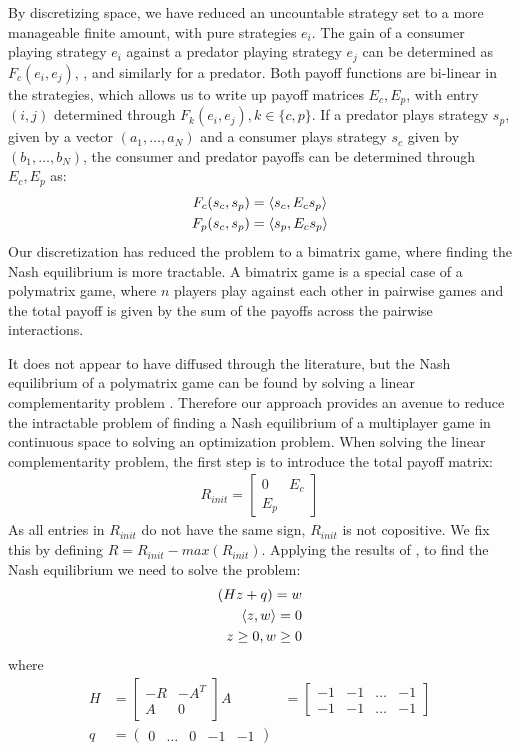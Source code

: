 By discretizing space, we have reduced an uncountable strategy set to a more manageable finite amount, with pure strategies $e_i$. The gain of a consumer playing strategy $e_i$ against a predator playing strategy $e_j$ can be determined as $F_c(e_i,e_j)$, , and similarly for a predator. Both payoff functions are bi-linear in the strategies, which allows us to write up payoff matrices $E_c, E_p$, with entry $(i,j)$ determined through $F_k(e_i,e_j), k \in \{c, p\}$. If a predator plays strategy $s_p$, given by a vector $(a_1,\dots,a_N)$ and a consumer plays strategy $s_c$ given by $(b_1,\dots,b_N)$, the consumer and predator payoffs can be determined through $E_c,E_p$ as:
\begin{align*}
  F_c(s_c,s_p)&=\left \langle s_c,E_c s_p \right \rangle \\
  F_p(s_c,s_p)&=\left \langle s_p,E_c s_p \right \rangle
\end{align*}
Our discretization has reduced the problem to a bimatrix game, where finding the Nash equilibrium is more tractable. A bimatrix game is a special case of a polymatrix game, where $n$ players play against each other in pairwise games and the total payoff is given by the sum of the payoffs across the pairwise interactions.

It does not appear to have diffused through the literature, but the Nash equilibrium of a polymatrix game can be found by solving a linear complementarity problem \citep{miller1991copositive}. Therefore our approach provides an avenue to reduce the intractable problem of finding a Nash equilibrium of a multiplayer game in continuous space to solving an optimization problem.
When solving the linear complementarity problem, the first step is to introduce the total payoff matrix:
\begin{align*}
	R_{init} = \begin{bmatrix} 0 & E_c \\ E_p \end{bmatrix}
\end{align*}
As all entries in $R_{init}$ do not have the same sign, $R_{init}$ is not copositive. We fix this by defining $R=R_{init}-max(R_{init})$.
Applying the results of \citep{miller1991copositive}, to find the Nash equilibrium we need to solve the problem:
\begin{align}
	(Hz+q) = w & \\
	\left \langle z,w \right \rangle = 0 & \\
	z\geq 0, w\geq 0
  \label{eq:lcp}
\end{align}
where
\begin{align*}
  H &= \begin{bmatrix} -R & -A^T \\ A & 0 \end{bmatrix}
	A &= \begin{bmatrix} -1 &-1 & \dots & -1 \\  -1 &-1 & \dots & -1 \end{bmatrix} \\
	q &= \begin{pmatrix} 0 &\dots & 0 & -1 & -1 \end{pmatrix}   \\
\end{align*}

